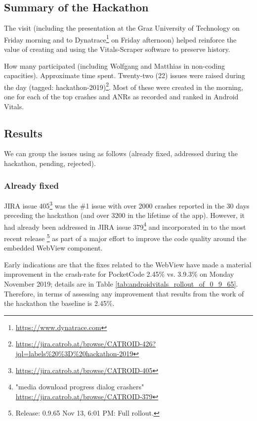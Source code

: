 \subsection{Summary of the Hackathon}
The visit (including the presentation at the Graz University of Technology on Friday morning and to Dynatrace\footnote{\url{https://www.dynatrace.com}} on Friday afternoon) helped reinforce the value of creating and using the Vitals-Scraper software to preserve history. 

How many participated (including Wolfgang and Matthias in non-coding capacities). Approximate time spent. Twenty-two (22) issues were raised during the day (tagged: hackathon-2019)\footnote{\url{https://jira.catrob.at/browse/CATROID-426?jql=labels\%20\%3D\%20hackathon-2019}}. Most of these were created in the morning, one for each of the top crashes and ANRs as recorded and ranked in Android Vitals. 

\subsection{Results}
We can group the issues using as follows (already fixed, addressed during the hackathon, pending, rejected).

\subsubsection{Already fixed} JIRA issue 405\footnote{\url{https://jira.catrob.at/browse/CATROID-405}} was the \#1 issue with over 2000 crashes reported in the 30 days preceding the hackathon (and over 3200 in the lifetime of the app). However, it had already been addressed in JIRA issue 379\footnote{"media download progress dialog crashers" \url{https://jira.catrob.at/browse/CATROID-379}} and incorporated in to the most recent release \footnote{Release:
0.9.65 Nov 13, 6:01 PM: Full rollout.} as part of a major effort to improve the code quality around the embedded WebView component.

Early indications are that the fixes related to the WebView have made a material improvement in the crash-rate for PocketCode 2.45\% vs. 3.9.3\% on Monday  November 2019; details are in Table \ref{tab:androidvitals_rollout_of_0_9_65}. Therefore, in terms of assessing any improvement that results from the work of the hackathon the baseline is 2.45\%.

